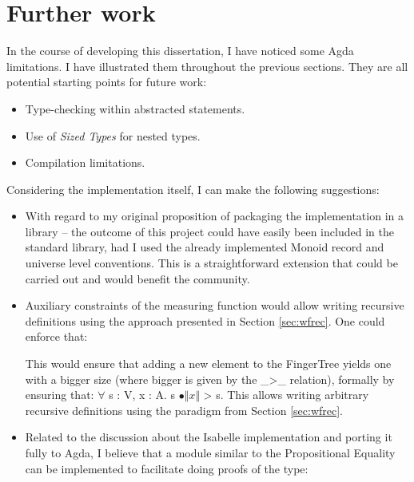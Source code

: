 \documentclass[12pt,twoside,notitlepage]{report}
\begin{document}
\section{Further work}

In the course of developing this dissertation, I have noticed some Agda limitations. I have illustrated them throughout the previous sections. They are all potential starting points for future work:

\begin{itemize}
\item Type-checking within  abstracted statements.
\item Use of \textit{Sized Types} for nested types.
\item Compilation limitations.
\end{itemize} \hfill

\noindent Considering the implementation itself, I can make the following suggestions:

\begin{itemize}

\item With regard to my original proposition of packaging the implementation in a library -- the outcome of this project could have easily been included in the standard library, had I used the already implemented Monoid record and universe level conventions. This is a straightforward extension that could be carried out and would benefit the community.

\item Auxiliary constraints of the measuring function would allow writing recursive definitions using the approach presented in Section \ref{sec:wfrec}. One could enforce that:

\begin{code}
\>[4]\<[6]%
\>[6] \AgdaSymbol{:}     \AgdaBound{>}   \<%
\end{code} 
This would ensure that adding a new element to the FingerTree yields one with a bigger size (where bigger is given by the \_>\_ relation), formally by ensuring that: $\forall$ s : V, x : A. s $∙ \Vert x \Vert$ > s. This allows writing arbitrary recursive definitions using the paradigm from Section \ref{sec:wfrec}.
 
\item Related to the discussion about the Isabelle implementation \cite{isabelle} and porting it fully to Agda, I believe that a module similar to the Propositional Equality can be implemented to facilitate doing proofs of the type:
 
\indent {}   
\end{itemize}
\end{document}
